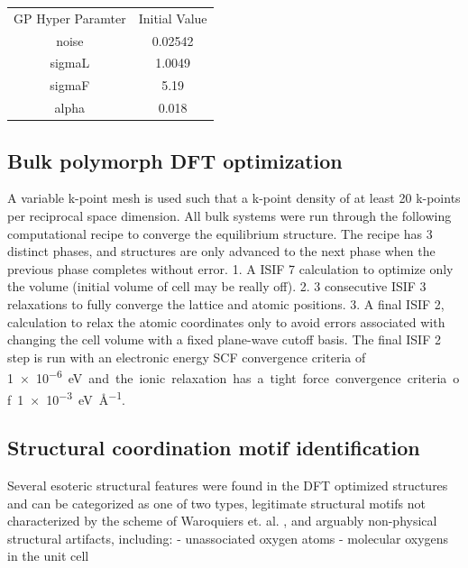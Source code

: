 \begin{table}[htbp]
\centering
\begin{tabular}{cc}
  GP Hyper Paramter & Initial Value \\
  noise & 0.02542 \\
  sigmaL & 1.0049 \\
  sigmaF & 5.19 \\
  alpha & 0.018
\end{tabular}
\end{table}



\subsection{Bulk polymorph DFT optimization}  %
%
%
A variable k-point mesh is used such that a k-point density of at least \num{20} k-points per reciprocal space dimension.
%
All bulk systems were run through the following computational recipe to converge the equilibrium structure.
%
The recipe has \num{3} distinct phases, and structures are only advanced to the next phase when the previous phase completes without error.
%
1. A ISIF \num{7} calculation to optimize only the volume (initial volume of cell may be really off).
%
2. \num{3} consecutive ISIF \num{3} relaxations to fully converge the lattice and atomic positions.
%
3. A final ISIF \num{2}, calculation to relax the atomic coordinates only to avoid errors associated with changing the cell volume with a fixed plane-wave cutoff basis.
%
The final ISIF \num{2} step is run with an electronic energy SCF convergence criteria of \SI{1e-6} eV and the ionic relaxation has a tight force convergence criteria of \SI{1e-3}{\electronvolt\per\angstrom}.


\subsection{Structural coordination motif identification} %
%
Several esoteric structural features were found in the DFT optimized structures and can be categorized as one of two types,
legitimate structural motifs not characterized by the scheme of Waroquiers et. al. \cite{Waroquiers2017}, and arguably non-physical structural artifacts, including:
- unassociated oxygen atoms
- molecular oxygens in the unit cell

